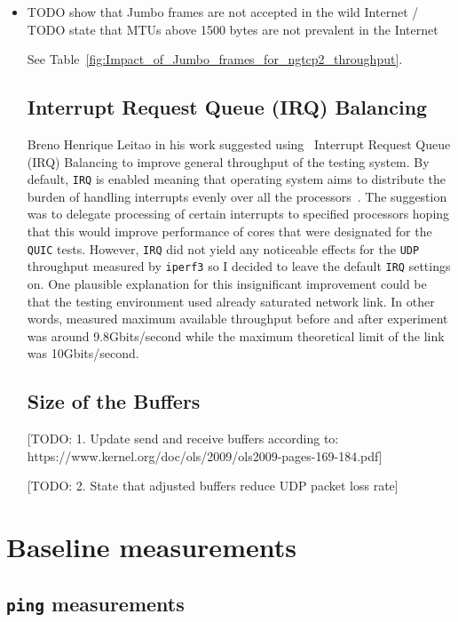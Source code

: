 \documentclass[12pt,a4paper,twoside,openright]{report}
\begin{document}
\begin{itemize}
  
  \item TODO show that Jumbo frames are not accepted in the wild Internet / TODO state that MTUs above 1500 bytes are not prevalent in the Internet
  
  
  See Table~\ref{fig:Impact_of_Jumbo_frames_for_ngtcp2_throughput}.
  
  
\subsection{Interrupt Request Queue (IRQ) Balancing} 
Breno Henrique Leitao in his work suggested using~\cite{Tuning_10Gb_network_cards_on_Linux} Interrupt Request Queue (IRQ) Balancing to improve general throughput of the testing system.
By default, \texttt{IRQ} is enabled meaning that operating system aims to distribute the burden of handling interrupts evenly over all the processors~\cite{Tuning_10Gb_network_cards_on_Linux}.
The suggestion was to delegate processing of certain interrupts to specified processors hoping that this would improve performance of cores that were designated for the \texttt{QUIC} tests.
However, \texttt{IRQ} did not yield any noticeable effects for the \texttt{UDP} throughput measured by \texttt{iperf3} so I decided to leave the default \texttt{IRQ} settings on.
One plausible explanation for this insignificant improvement could be that the testing environment used already saturated network link.
In other words, measured maximum available throughput before and after experiment was around 9.8Gbits/second while the maximum theoretical limit of the link was 10Gbits/second. 


\subsection{Size of the Buffers} 

[TODO: 1. Update send and receive buffers according to: https://www.kernel.org/doc/ols/2009/ols2009-pages-169-184.pdf]  

[TODO: 2. State that adjusted buffers reduce UDP packet loss rate] 
 
 
  
\end{itemize}


\section{Baseline measurements}

\subsection{\texttt{ping} measurements}
\end{document}
